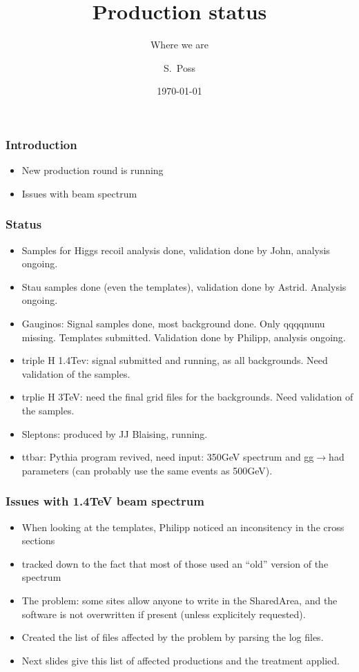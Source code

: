 \documentclass{beamer}
\title{Production status}
\subtitle{Where we are}
\author{S.~Poss}
\institute[CERN]
{%
CERN, Switzerland
}
\date{\today}
\begin{document}
\begin{frame}
\titlepage
\end{frame}

\begin{frame}
\frametitle{Introduction}
\begin{itemize}
  \item New production round is running
  \item Issues with beam spectrum
\end{itemize}
\end{frame}

\begin{frame}
\frametitle{Status}
\begin{itemize}
  \item Samples for Higgs recoil analysis done, validation done by John,
  analysis ongoing.
  \item Stau samples done (even the templates), validation done by Astrid.
  Analysis ongoing.
  \item Gauginos: Signal samples done, most background done. Only qqqqnunu
  missing. Templates submitted. Validation done by Philipp, analysis ongoing.
  \item triple H 1.4Tev: signal submitted and running, as all backgrounds. Need
  validation of the samples.
  \item trplie H 3TeV: need the final grid files for the backgrounds. Need
  validation of the samples.
  \item Sleptons: produced by JJ Blaising, running. 
  \item ttbar: Pythia program revived, need input: 350GeV spectrum and
  gg$\to$had parameters (can probably use the same events as 500GeV).
\end{itemize}
\end{frame}

\begin{frame}
\frametitle{Issues with 1.4TeV beam spectrum}
\begin{itemize}
  \item When looking at the templates, Philipp noticed an inconsitency in the
  cross sections
  \item tracked down to the fact that most of those used an ``old'' version of
  the spectrum
  \item The problem: some sites allow anyone to write in the SharedArea, and the
  software is not overwritten if present (unless explicitely requested).
  \item Created the list of files affected by the problem by parsing the log
  files.
  \item Next slides give this list of affected productions and the treatment
  applied.
\end{itemize}
\end{frame}
\end{document}
